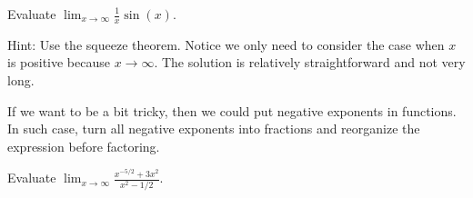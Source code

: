 \documentclass[../main.tex]{subfiles}
\begin{document}
  \begin{example}
    Evaluate \(\lim_{x \to \infty} \frac{1}{x} \sin(x)\).

    {\scriptsize Hint: Use the squeeze theorem. Notice we only need to consider the case when \(x\) is positive because \(x \to \infty\). The solution is relatively straightforward and not very long.}

  \end{example}

  If we want to be a bit tricky, then we could put negative exponents in functions.  In such case, turn all negative exponents into fractions and reorganize the expression before factoring.
  \begin{example}
    Evaluate \(\lim_{x \to \infty} \frac{x^{-5/2} + 3x^{2}}{x^{2} - 1/2}\). 
  \end{example}
\end{document}
